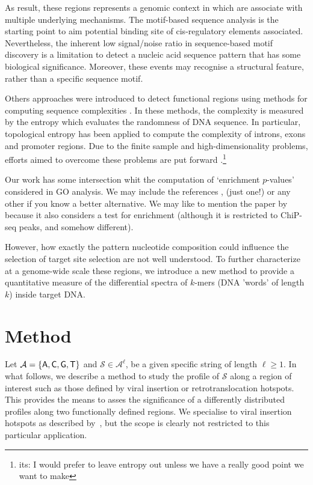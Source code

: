 \documentclass{bioinfo}
\begin{document}
As result, these regions represents a genomic context in which are associate with multiple underlying mechanisms. The motif-based sequence analysis is the starting point to aim potential binding site of cis-regulatory elements associated. Nevertheless, the inherent low signal/noise ratio in sequence-based motif discovery is a limitation to detect a nucleic acid sequence pattern that has some biological significance. Moreover, these events may recognise a structural feature, rather than a specific sequence motif.

Others approaches were introduced to detect functional regions using methods for computing sequence complexities \cite{pmid24533097,pmid21317142}. In these methods, the complexity is measured by the entropy which evaluates the randomness of DNA sequence. In particular, topological entropy has been applied to compute the complexity of introns, exons and promoter regions. Due to the finite sample and high-dimensionality problems, efforts aimed to overcome these problems are put forward \cite{pmid21317142}.\footnote{its: I would prefer to leave entropy out unless we have a really good point we want to make}


Our work has some intersection whit the computation of `enrichment $p$-values' considered in  GO analysis. We may include the references \cite{HSL}, \cite{RPTP} (just one!) or any other if you know a better alternative. We may like to mention the paper by \cite{BM} because it also considers a test for enrichment (although it is restricted to ChiP-seq peaks, and somehow different).

However, how exactly the pattern nucleotide composition could influence the selection of target site selection are not well understood. To further characterize at a genome-wide scale these regions, we introduce a new method to provide a quantitative measure of the differential spectra of $k$-mers (DNA 'words' of length $k$) inside target DNA.





\section{Method}
Let $\mathcal A = \{\sf A, C, G, T\}$ and $\mathcal S \in \mathcal A^\ell$, be a given specific string of length $\ell\geq 1$. %
In what follows, we describe a method to study the profile of $\mathcal S$ along a region of interest such as those defined by viral insertion or retrotranslocation hotspots. This provides the means to asses the significance of a differently distributed profiles along two functionally defined regions. We specialise to viral insertion hotspots as described by~\cite{IRAMM}, but the scope is clearly not restricted to this particular application. 
\end{document}
